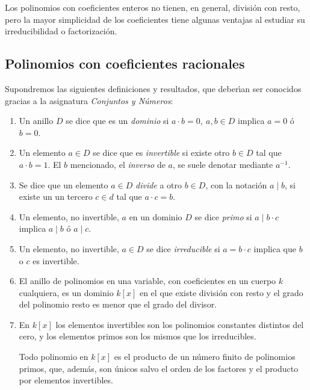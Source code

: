 Los polinomios con coeficientes enteros no tienen, en general, divisi\'on con
resto, pero la mayor simplicidad de los coeficientes tiene algunas ventajas al
estudiar su irreducibilidad o factorizaci\'on.

\subsection{Polinomios con coeficientes racionales}
Supondremos las siguientes definiciones y resultados, que deber\'{\i}an ser
conocidos gracias a la asignatura {\itshape Conjuntos y N\'umeros}:

\begin{enumerate}
 \item Un anillo $D$ se dice que es un {\itshape dominio} si $a\cdot b =0,\ a,b
\in D$ implica $a=0$ \'o $b=0$. 
 
 \item Un elemento $a\in D$ se dice que es {\itshape invertible} si existe otro
$b\in D$ tal que $a\cdot b =1.$ El $b$ mencionado, el {\itshape inverso} de $a$,
 se suele denotar mediante $a^{-1}.$

\item Se dice que un elemento $a\in D$ {\itshape divide} a otro $b\in D$, con la
notaci\'on $a\mid b$,  si existe un un tercero $c\in d$ tal que $a\cdot c=b.$
 
\item Un elemento, no invertible, $a$ en un dominio $D$ se dice {\itshape
primo} si $a\mid b\cdot c$    implica  $a \mid  b$ \'o  $ a \mid c$.

\item Un elemento, no invertible, $a \in D$  se dice {\itshape irreducible}  si 
$a=b\cdot c$  implica
que $b$ o $c$ es invertible.

 \item El anillo de polinomios en una variable,  con coeficientes en un cuerpo
$k$ cualquiera, es un dominio $k[x]$ en el que existe divisi\'on con resto y el
grado del polinomio resto es menor que el grado del divisor.

\item En $k[x]$ los elementos invertibles son los polinomios constantes
distintos del cero, y los elementos primos son los mismos que los irreducibles. 

Todo polinomio en $k[x]$ es el producto de un n\'umero finito de polinomios
primos, que, adem\'as, son \'unicos salvo el orden de los factores  y el
producto por elementos invertibles.
 \end{enumerate}
 

